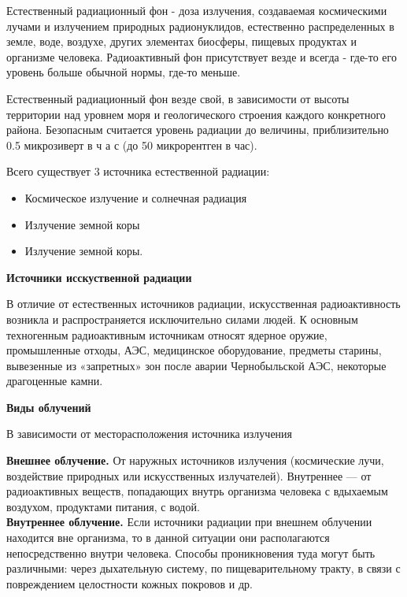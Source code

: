 \documentclass[a4paper, 12pt]{article}
\theoremstyle{definition}
\begin{document}
        Естественный радиационный фон - доза излучения, создаваемая космическими лучами и излучением природных радионуклидов, естественно распределенных в земле, воде, воздухе, других элементах биосферы, пищевых продуктах и организме человека. Радиоактивный фон присутствует везде и всегда - где-то его уровень больше обычной нормы, где-то меньше. 

        Естественный радиационный фон везде свой, в зависимости от высоты территории над уровнем моря и геологического строения каждого конкретного района. Безопасным считается уровень радиации до величины, приблизительно 0.5 микрозиверт в ч а с (до 50 микрорентген в час).
        
        Всего существует 3 источника естественной радиации:
        \begin{itemize}
            \item Космическое излучение и солнечная радиация
            \item Излучение земной коры
            \item Излучение земной коры.
        \end{itemize}
        \begin{center}
            \textbf{Источники исскуственной радиации} 
        \end{center}
        В отличие от естественных источников радиации, искусственная радиоактивность возникла и распространяется исключительно силами людей. К основным техногенным радиоактивным источникам относят ядерное оружие, промышленные отходы, АЭС,  медицинское оборудование, предметы старины, вывезенные из «запретных» зон после аварии Чернобыльской АЭС, некоторые драгоценные камни. 
        \begin{center}
            \textbf{Виды облучений}
            
            В зависимости от месторасположения источника излучения
        \end{center}
        \textbf{Внешнее облучение.}
        От наружных источников излучения (космические лучи, воздействие природных или искусственных излучателей). Внутреннее — от радиоактивных веществ, попадающих внутрь организма человека с вдыхаемым воздухом, продуктами питания, с водой.\\
        \textbf{Внутреннее облучение.}
        Если источники радиации при внешнем облучении находится вне организма, то в данной ситуации они располагаются непосредственно внутри человека. Способы проникновения туда могут быть различными: через дыхательную систему, по пищеварительному тракту, в связи с повреждением целостности кожных покровов и др.
\end{document}
